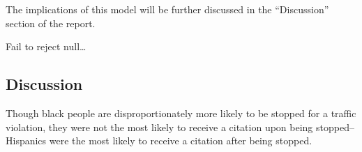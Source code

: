 \documentclass[
]{article}
\begin{document}
The implications of this model will be further discussed in the
``Discussion'' section of the report.

Fail to reject null\ldots{}

\hypertarget{discussion}{%
\subsection{Discussion}\label{discussion}}

Though black people are disproportionately more likely to be stopped for
a traffic violation, they were not the most likely to receive a citation
upon being stopped--Hispanics were the most likely to receive a citation
after being stopped.
\end{document}
